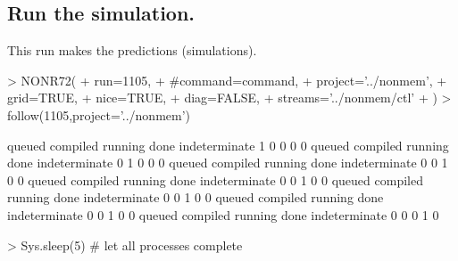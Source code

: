 \subsection{Run the simulation.}
This run makes the predictions (simulations).
\begin{Schunk}
\begin{Sinput}
> NONR72(
+      run=1105,
+      #command=command,
+      project='../nonmem',
+      grid=TRUE,
+      nice=TRUE,
+      diag=FALSE,
+      streams='../nonmem/ctl'
+ )
> follow(1105,project='../nonmem')
\end{Sinput}
\begin{Soutput}
       queued      compiled       running          done indeterminate 
            1             0             0             0             0 
       queued      compiled       running          done indeterminate 
            0             1             0             0             0 
       queued      compiled       running          done indeterminate 
            0             0             1             0             0 
       queued      compiled       running          done indeterminate 
            0             0             1             0             0 
       queued      compiled       running          done indeterminate 
            0             0             1             0             0 
       queued      compiled       running          done indeterminate 
            0             0             1             0             0 
       queued      compiled       running          done indeterminate 
            0             0             0             1             0 
\end{Soutput}
\begin{Sinput}
> Sys.sleep(5) # let all processes complete
\end{Sinput}
\end{Schunk}

